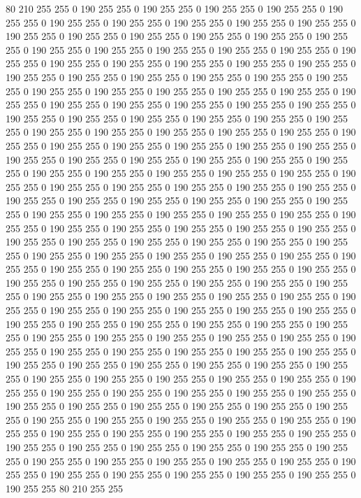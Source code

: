 80 210 255 255 0 190 255 255 0 190 255 255 0 190 255 255 0 190 255 255 0 190 255 255 0 190 255 255 0 190 255 255 0 190 255 255 0 190 255 255 0 190 255 255 0 190 255 255 0 190 255 255 0 190 255 255 0 190 255 255 0 190 255 255 0 190 255 255 0 190 255 255 0 190 255 255 0 190 255 255 0 190 255 255 0 190 255 255 0 190 255 255 0 190 255 255 0 190 255 255 0 190 255 255 0 190 255 255 0 190 255 255 0 190 255 255 0 190 255 255 0 190 255 255 0 190 255 255 0 190 255 255 0 190 255 255 0 190 255 255 0 190 255 255 0 190 255 255 0 190 255 255 0 190 255 255 0 190 255 255 0 190 255 255 0 190 255 255 0 190 255 255 0 190 255 255 0 190 255 255 0 190 255 255 0 190 255 255 0 190 255 255 0 190 255 255 0 190 255 255 
0 190 255 255 0 190 255 255 0 190 255 255 0 190 255 255 0 190 255 255 0 190 255 255 0 190 255 255 0 190 255 255 0 190 255 255 0 190 255 255 0 190 255 255 0 190 255 255 0 190 255 255 0 190 255 255 0 190 255 255 0 190 255 255 0 190 255 255 0 190 255 255 0 190 255 255 0 190 255 255 0 190 255 255 0 190 255 255 0 190 255 255 0 190 255 255 0 190 255 255 0 190 255 255 0 190 255 255 0 190 255 255 0 190 255 255 0 190 255 255 0 190 255 255 0 190 255 255 0 190 255 255 0 190 255 255 0 190 255 255 0 190 255 255 0 190 255 255 0 190 255 255 0 190 255 255 0 190 255 255 0 190 255 255 0 190 255 255 0 190 255 255 0 190 255 255 0 190 255 255 0 190 255 255 0 190 255 255 0 190 255 255 0 190 255 255 0 190 255 255 
0 190 255 255 0 190 255 255 0 190 255 255 0 190 255 255 0 190 255 255 0 190 255 255 0 190 255 255 0 190 255 255 0 190 255 255 0 190 255 255 0 190 255 255 0 190 255 255 0 190 255 255 0 190 255 255 0 190 255 255 0 190 255 255 0 190 255 255 0 190 255 255 0 190 255 255 0 190 255 255 0 190 255 255 0 190 255 255 0 190 255 255 0 190 255 255 0 190 255 255 0 190 255 255 0 190 255 255 0 190 255 255 0 190 255 255 0 190 255 255 0 190 255 255 0 190 255 255 0 190 255 255 0 190 255 255 0 190 255 255 0 190 255 255 0 190 255 255 0 190 255 255 0 190 255 255 0 190 255 255 0 190 255 255 0 190 255 255 0 190 255 255 0 190 255 255 0 190 255 255 0 190 255 255 0 190 255 255 0 190 255 255 0 190 255 255 0 190 255 255 
0 190 255 255 0 190 255 255 0 190 255 255 0 190 255 255 0 190 255 255 0 190 255 255 0 190 255 255 0 190 255 255 0 190 255 255 0 190 255 255 0 190 255 255 0 190 255 255 0 190 255 255 0 190 255 255 0 190 255 255 0 190 255 255 0 190 255 255 0 190 255 255 0 190 255 255 0 190 255 255 0 190 255 255 0 190 255 255 0 190 255 255 0 190 255 255 0 190 255 255 0 190 255 255 0 190 255 255 0 190 255 255 0 190 255 255 0 190 255 255 0 190 255 255 0 190 255 255 0 190 255 255 0 190 255 255 0 190 255 255 0 190 255 255 0 190 255 255 0 190 255 255 0 190 255 255 0 190 255 255 0 190 255 255 0 190 255 255 0 190 255 255 0 190 255 255 0 190 255 255 0 190 255 255 0 190 255 255 0 190 255 255 0 190 255 255 80 210 255 255 

